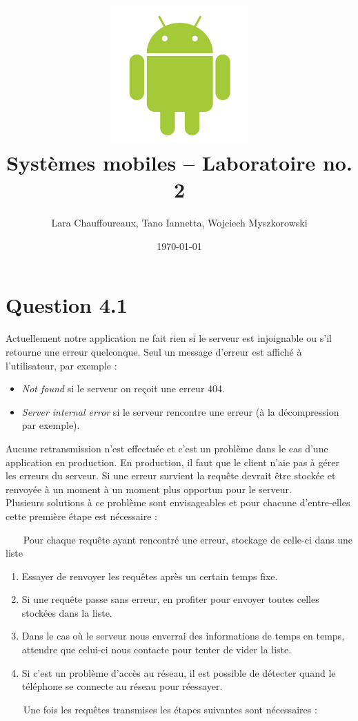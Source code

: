 \documentclass[12pt]{article}
\title{\includegraphics[width=200px]{title}\\
  \vspace{40 mm}
  \huge{Systèmes mobiles -- Laboratoire no. 2}
\vspace{20 mm}
}
\author{Lara Chauffoureaux, Tano Iannetta, Wojciech Myszkorowski}
\date{\today}
\begin{document}
\maketitle
\thispagestyle{empty}
\clearpage

\section*{Question 4.1}

Actuellement notre application ne fait rien si le serveur est injoignable ou s'il retourne une erreur quelconque. Seul un message d'erreur est affiché à l'utilisateur, par exemple : 

\begin{itemize}
\item \emph{Not found} si le serveur on reçoit une erreur 404.
\item \emph{Server internal error} si le serveur rencontre une erreur (à la décompression par exemple).
\end{itemize}

Aucune retransmission n'est effectuée et c'est un problème dans le cas d'une application en production. En production, il faut que le client n'aie pas à gérer les erreurs du serveur. Si une erreur survient la requête devrait être stockée et renvoyée à un moment à un moment plus opportun pour le serveur. \\

Plusieurs solutions à ce problème sont envisageables et pour chacune d'entre-elles cette première étape est nécessaire :

~~~ \textcolor{pred}{Pour chaque requête ayant rencontré une erreur, stockage de celle-ci dans une liste}

\begin{enumerate}
\item Essayer de renvoyer les requêtes après un certain temps fixe.
\item Si une requête passe sans erreur, en profiter pour envoyer toutes celles stockées dans la liste.
\item Dans le cas où le serveur nous enverrai des informations de temps en temps, attendre que celui-ci nous contacte pour tenter de vider la liste.
\item Si c'est un problème d'accès au réseau, il est possible de détecter quand le téléphone se connecte au réseau pour réessayer.
\end{enumerate}

~~~ \textcolor{pgreen}{Une fois les requêtes transmises les étapes suivantes sont nécessaires :} 
\end{document}

